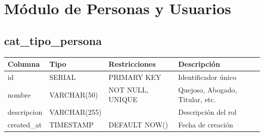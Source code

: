 \documentclass[12pt, a4paper]{article}
\begin{document}
\section{Módulo de Personas y Usuarios}
\label{sec:personas}

\subsection{cat\_tipo\_persona}
\begin{longtable}{|p{3.5cm}|p{2.5cm}|p{3cm}|p{5cm}|}
    \hline
    \rowcolor[gray]{0.9}
    \textbf{Columna} & \textbf{Tipo} & \textbf{Restricciones} & \textbf{Descripción} \\
    \hline
    id & SERIAL & PRIMARY KEY & Identificador único \\
    \hline
    nombre & VARCHAR(50) & NOT NULL, UNIQUE & Quejoso, Abogado, Titular, etc. \\
    \hline
    descripcion & VARCHAR(255) & & Descripción del rol \\
    \hline
    created\_at & TIMESTAMP & DEFAULT NOW() & Fecha de creación \\
    \hline
\end{longtable}
\end{document}
